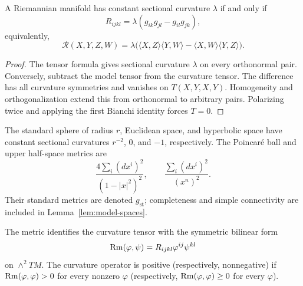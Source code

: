 \begin{lemma}
\label{lem:constant-curvature-tensor}





A Riemannian manifold has constant sectional curvature $\lambda$ if
and only if
\[
  R_{ijkl}=\lambda(g_{ik}g_{jl}-g_{il}g_{jk}),
\]
equivalently,
\[
  \mathcal R(X,Y,Z,W)=\lambda\bigl(
  \langle X,Z\rangle\langle Y,W\rangle
  -\langle X,W\rangle\langle Y,Z\rangle\bigr).
\]
\end{lemma}

\begin{proof}
\sketch
{}

The tensor formula gives sectional curvature $\lambda$ on every
orthonormal pair. Conversely, subtract the model tensor from the
curvature tensor. The difference has all curvature symmetries and
vanishes on $T(X,Y,X,Y)$. Homogeneity and orthogonalization extend this
from orthonormal to arbitrary pairs. Polarizing twice and applying the
first Bianchi identity forces $T=0$.
\end{proof}

The standard sphere of radius $r$, Euclidean space, and hyperbolic space
have constant sectional curvatures $r^{-2}$, $0$, and $-1$,
respectively. The Poincar\'e ball and upper half-space metrics are
\[
  \frac{4\sum_i(dx^i)^2}{(1-|x|^2)^2},
  \qquad
  \frac{\sum_i(dx^i)^2}{(x^n)^2}.
\]
Their standard metrics are denoted $g_{\mathrm{st}}$; completeness and
simple connectivity are included in Lemma~\ref{lem:model-spaces}.


\begin{definition}
\label{def:curvature-operator}





The metric identifies the curvature tensor with the symmetric bilinear
form
\[
  \operatorname{Rm}(\varphi,\psi)=R_{ijkl}\varphi^{ij}\psi^{kl}
\]
on $\wedge^2TM$. The curvature operator is positive (respectively,
nonnegative) if $\operatorname{Rm}(\varphi,\varphi)>0$ for every nonzero $\varphi$
(respectively, $\operatorname{Rm}(\varphi,\varphi)\ge0$ for every $\varphi$).
\end{definition}

